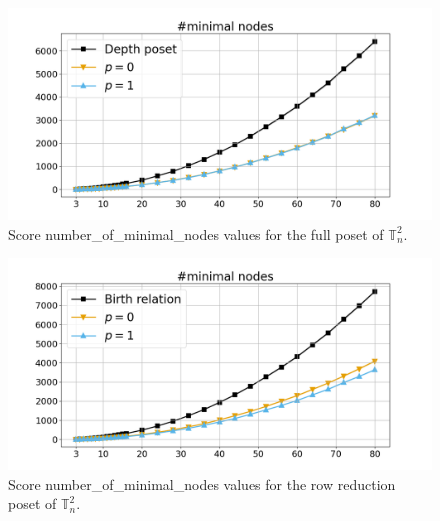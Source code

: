\documentclass{article}
\begin{document}
    \begin{figure}[h!]
        \centering
        \hspace*{-0.24\textwidth}
        \includegraphics[width=1.4\textwidth]{pics/extended torus scores/score=number-of-minimal-nodes, dim=2, object=full.png}
        \caption{Score number\_of\_minimal\_nodes values for the full poset of $\mathbb{T}_n^{2}$.}
        \label{fig:numberofminimalnodes-full2}
    \end{figure}
    \begin{figure}[h!]
        \centering
        \hspace*{-0.24\textwidth}
        \includegraphics[width=1.4\textwidth]{pics/extended torus scores/score=number-of-minimal-nodes, dim=2, object=row reduction.png}
        \caption{Score number\_of\_minimal\_nodes values for the row reduction poset of $\mathbb{T}_n^{2}$.}
        \label{fig:numberofminimalnodes-rowreduction2}
    \end{figure}
\end{document}
